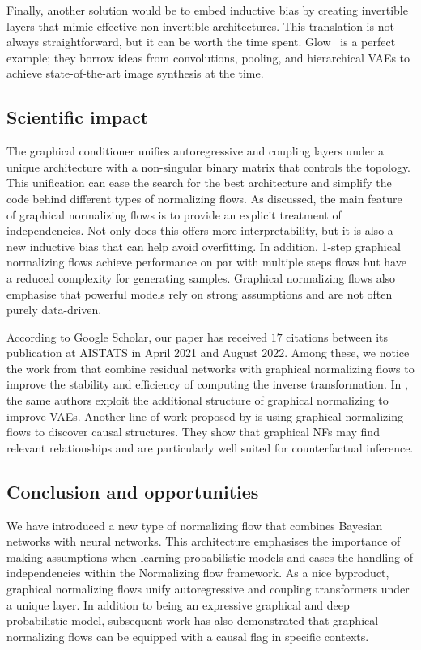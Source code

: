 Finally, another solution would be to embed inductive bias by creating invertible layers that mimic effective non-invertible architectures. This translation is not always straightforward, but it can be worth the time spent. Glow~\citep{kingma_glow_2018} is a perfect example; they borrow ideas from convolutions, pooling, and hierarchical VAEs to achieve state-of-the-art image synthesis at the time.




\subsection{Scientific impact}
The graphical conditioner unifies autoregressive and coupling layers under a unique architecture with a non-singular binary matrix that controls the topology. This unification can ease the search for the best architecture and simplify the code behind different types of normalizing flows. As discussed, the main feature of graphical normalizing flows is to provide an explicit treatment of independencies. Not only does this offers more interpretability, but it is also a new inductive bias that can help avoid overfitting. In addition, 1-step graphical normalizing flows achieve performance on par with multiple steps flows but have a reduced complexity for generating samples. Graphical normalizing flows also emphasise that powerful models rely on strong assumptions and are not often purely data-driven.

According to Google Scholar, our paper has received $17$ citations between its publication at AISTATS in April 2021 and August 2022. Among these, we notice the work from \citet{mouton2022graphical} that combine residual networks with graphical normalizing flows to improve the stability and efficiency of computing the inverse transformation. In \citet{mouton2022siren}, the same authors exploit the additional structure of graphical normalizing to improve VAEs. Another line of work proposed by \citet{balgi2022personalized} is using graphical normalizing flows to discover causal structures. They show that graphical NFs may find relevant relationships and are particularly well suited for counterfactual inference.

\subsection{Conclusion and opportunities}
We have introduced a new type of normalizing flow that combines Bayesian networks with neural networks. This architecture emphasises the importance of making assumptions when learning probabilistic models and eases the handling of independencies within the Normalizing flow framework. As a nice byproduct, graphical normalizing flows unify autoregressive and coupling transformers under a unique layer. In addition to being an expressive graphical and deep probabilistic model, subsequent work has also demonstrated that graphical normalizing flows can be equipped with a causal flag in specific contexts.

